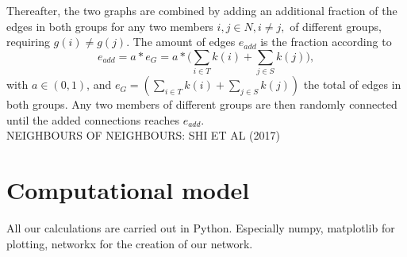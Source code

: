 \documentclass[11pt]{article}
\begin{document}
Thereafter, the two graphs are combined by adding an additional fraction of the edges in both groups for any two members \(i,j\in{N},i\neq j,\) of different groups, requiring \(g(i)\neq g(j)\). The amount of edges \(e_{add}\) is the fraction according to 
\begin{equation}
e_{add}=a*e_{G}=a*\bigg(\sum_{i\in{T}}k(i) + \sum_{j\in{S}}k(j)\bigg),
\end{equation}
 with \(a\in{(0,1)}\), and \(e_{G}=(\sum_{i\in{T}}k(i) + \sum_{j\in{S}}k(j))\) the total of edges in both groups. Any two members of different groups are then randomly connected until the added connections reaches \(e_{add}\).  \\
NEIGHBOURS OF NEIGHBOURS: SHI ET AL (2017)



\section{Computational model}
All our calculations are carried out in Python. Especially numpy, matplotlib for plotting, networkx for the creation of our network. 
\end{document}
